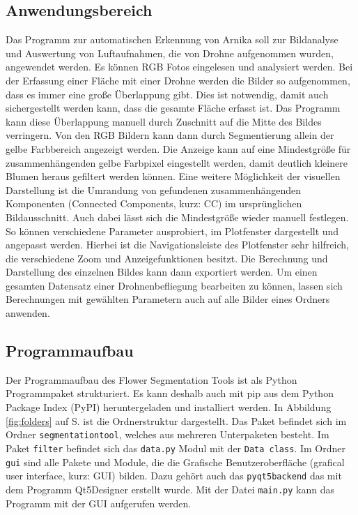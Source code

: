 \subsection{Anwendungsbereich} %
Das Programm zur automatischen Erkennung von Arnika soll zur Bildanalyse und Auswertung von Luftaufnahmen, die von Drohne aufgenommen wurden, angewendet werden. Es können RGB Fotos eingelesen und analysiert werden. Bei der Erfassung einer Fläche mit einer Drohne werden die Bilder so aufgenommen, dass es immer eine große Überlappung gibt. Dies ist notwendig, damit auch sichergestellt werden kann, dass die gesamte Fläche erfasst ist. Das Programm kann diese Überlappung manuell durch Zuschnitt auf die Mitte des Bildes verringern. Von den RGB Bildern kann dann durch Segmentierung allein der gelbe Farbbereich angezeigt werden. Die Anzeige kann auf eine Mindestgröße für zusammenhängenden gelbe Farbpixel eingestellt werden, damit deutlich kleinere Blumen heraus gefiltert werden können. Eine weitere Möglichkeit der visuellen Darstellung ist die Umrandung von gefundenen zusammenhängenden Komponenten (Connected Components, kurz: CC) im ursprünglichen Bildausschnitt. Auch dabei lässt sich die Mindestgröße wieder manuell festlegen. So können verschiedene Parameter ausprobiert, im Plotfenster dargestellt und angepasst werden. Hierbei ist die Navigationsleiste des Plotfenster sehr hilfreich, die verschiedene Zoom und Anzeigefunktionen besitzt. Die Berechnung und Darstellung des einzelnen Bildes kann dann exportiert werden. Um einen gesamten Datensatz einer Drohnenbefliegung bearbeiten zu können, lassen sich Berechnungen mit gewählten Parametern auch auf alle Bilder eines Ordners anwenden.  

\subsection{Programmaufbau}

Der Programmaufbau des Flower Segmentation Tools ist als Python Programmpaket strukturiert. Es kann deshalb auch mit pip aus dem Python Package Index (PyPI) heruntergeladen und installiert werden. In Abbildung \ref{fig:folders} auf S. \pageref{fig:folders} ist die Ordnerstruktur dargestellt. Das Paket befindet sich im Ordner \texttt{segmentationtool}, welches aus mehreren Unterpaketen besteht. Im Paket \texttt{filter} befindet sich das \texttt{data.py} Modul mit der \texttt{Data class}. Im Ordner \texttt{gui} sind alle Pakete und Module, die die Grafische Benutzeroberfläche (grafical user interface, kurz: GUI) bilden. Dazu gehört auch das \texttt{pyqt5backend} das mit dem Programm Qt5Designer erstellt wurde. Mit der Datei \texttt{main.py} kann das Programm mit der GUI aufgerufen werden. 

